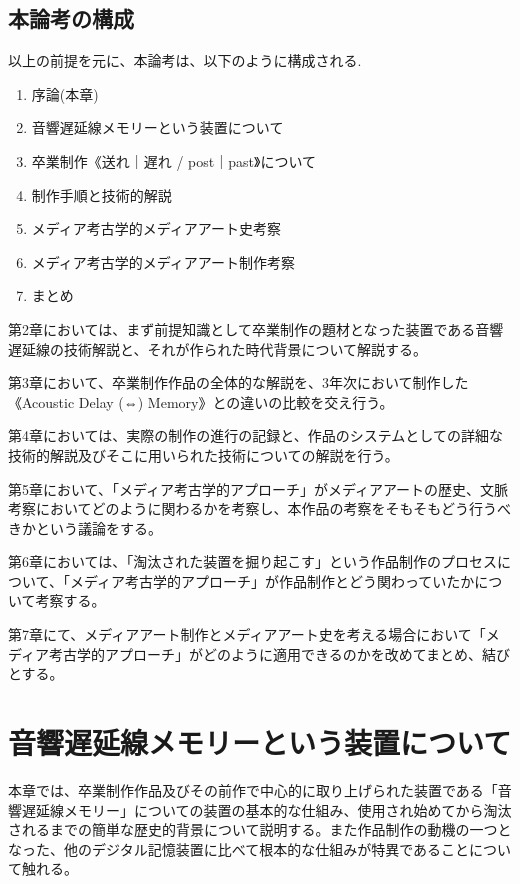 \documentclass[a4paper,report]{jsbook}
\begin{document}
\section{本論考の構成}\label{ux672cux8ad6ux8003ux306eux69cbux6210}

以上の前提を元に、本論考は、以下のように構成される.

\begin{enumerate}
\def\labelenumi{\arabic{enumi}.}
\tightlist
\item
  序論(本章)
\item
  音響遅延線メモリーという装置について
\item
  卒業制作《送れ｜遅れ / post｜past》について
\item
  制作手順と技術的解説
\item
  メディア考古学的メディアアート史考察
\item
  メディア考古学的メディアアート制作考察
\item
  まとめ
\end{enumerate}

第2章においては、まず前提知識として卒業制作の題材となった装置である音響遅延線の技術解説と、それが作られた時代背景について解説する。

第3章において、卒業制作作品の全体的な解説を、3年次において制作した《Acoustic
Delay (⇔) Memory》との違いの比較を交え行う。

第4章においては、実際の制作の進行の記録と、作品のシステムとしての詳細な技術的解説及びそこに用いられた技術についての解説を行う。

第5章において、「メディア考古学的アプローチ」がメディアアートの歴史、文脈考察においてどのように関わるかを考察し、本作品の考察をそもそもどう行うべきかという議論をする。

第6章においては、「淘汰された装置を掘り起こす」という作品制作のプロセスについて、「メディア考古学的アプローチ」が作品制作とどう関わっていたかについて考察する。

第7章にて、メディアアート制作とメディアアート史を考える場合において「メディア考古学的アプローチ」がどのように適用できるのかを改めてまとめ、結びとする。

\chapter{音響遅延線メモリーという装置について}\label{ux97f3ux97ffux9045ux5ef6ux7ddaux30e1ux30e2ux30eaux30fcux3068ux3044ux3046ux88c5ux7f6eux306bux3064ux3044ux3066}

本章では、卒業制作作品及びその前作で中心的に取り上げられた装置である「音響遅延線メモリー」についての装置の基本的な仕組み、使用され始めてから淘汰されるまでの簡単な歴史的背景について説明する。また作品制作の動機の一つとなった、他のデジタル記憶装置に比べて根本的な仕組みが特異であることについて触れる。
\end{document}
